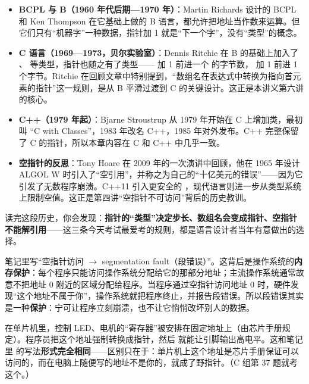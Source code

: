 \begin{historybox}[几个真正影响你今天写代码的节点]
\begin{itemize}
  \item \textbf{BCPL 与 B（1960 年代后期—1970 年）}：Martin Richards 设计的 BCPL 和 Ken Thompson 在它基础上做的 B 语言，都允许把地址当作数来运算。但它们只有“机器字”一种数据，指针加 1 就是“下一个字”，没有“类型”的概念。
  \item \textbf{C 语言（1969—1973，贝尔实验室）}：Dennis Ritchie 在 B 的基础上加入了 、 等类型，指针也随之有了类型—— 加 1 前进一个  的字节数， 加 1 前进 1 个字节。Ritchie 在回顾文章中特别提到，“数组名在表达式中转换为指向首元素的指针”这一规则，是从 B 平滑过渡到 C 的关键设计。这正是本讲义第六讲的核心。
  \item \textbf{C++（1979 年起）}：Bjarne Stroustrup 从 1979 年开始在 C 上增加类，最初叫 “C with Classes”，1983 年改名 C++，1985 年对外发布。C++ 完整保留了 C 的指针，所以本章内容在 C 和 C++ 中几乎一致。
  \item \textbf{空指针的反思}：Tony Hoare 在 2009 年的一次演讲中回顾，他在 1965 年设计 ALGOL W 时引入了“空引用”，并称之为自己的“十亿美元的错误”——因为它引发了无数程序崩溃。C++11 引入更安全的 ，现代语言则进一步从类型系统上限制空值。这正是第四讲“空指针不可访问”背后的历史教训。
\end{itemize}
\end{historybox}
\noindent 读完这段历史，你会发现：\textbf{指针的“类型”决定步长、数组名会变成指针、空指针不能解引用}——这三条今天考试最爱考的规则，都是语言设计者当年有意做出的选择。

\begin{sciencebox}
笔记里写“空指针访问 $\to$ segmentation fault（段错误）”。这背后是操作系统的\textbf{内存保护}：每个程序只能访问操作系统分配给它的那部分地址；主流操作系统通常故意不把地址 0 附近的区域分配给程序。当程序通过空指针访问地址 0 时，硬件发现“这个地址不属于你”，操作系统就把程序终止，并报告段错误。所以段错误其实是一种\textbf{保护}：宁可让程序立刻崩溃，也不让它悄悄改坏别人的数据。
\end{sciencebox}

\begin{sciencebox}
在单片机里，控制 LED、电机的“寄存器”被安排在固定地址上（由芯片手册规定）。程序员把这个地址强制转换成指针，然后  就能让引脚输出高电平。这和笔记里  的写法\textbf{形式完全相同}——区别只在于：单片机上这个地址是芯片手册保证可以访问的，而在电脑上随便写的地址不是你的，就成了野指针。（C 组第 37 题就考这个。）
\end{sciencebox}

